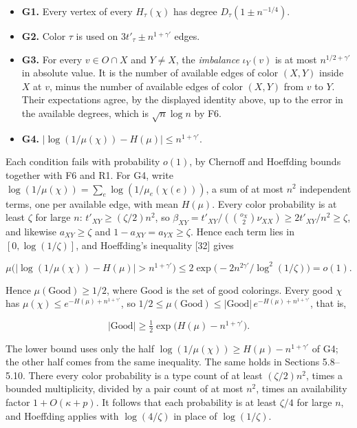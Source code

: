 \documentclass[english,11pt,a4paper]{article}
\providecommand{\tightlist}{\setlength{\itemsep}{0pt}\setlength{\parskip}{0pt}}
\begin{document}
\begin{itemize}
\tightlist
\item
  \textbf{G1.} Every vertex of every \(H_\tau(\chi)\) has degree \(D_\tau(1\pm n^{-1/4})\).
\item
  \textbf{G2.} Color \(\tau\) is used on \(3t'_\tau\pm n^{1+\gamma'}\) edges.
\item
  \textbf{G3.} For every \(v\in O\cap X\) and \(Y\ne X\), the \emph{imbalance} \(\iota_Y(v)\) is at most \(n^{1/2+\gamma'}\) in absolute value. It is the number of available edges of color \((X,Y)\) inside \(X\) at \(v\), minus the number of available edges of color \((X,Y)\) from \(v\) to \(Y\). Their expectations agree, by the displayed identity above, up to the error in the available degrees, which is \(\sqrt n\log n\) by F6.
\item
  \textbf{G4.} \(|\log(1/\mu(\chi))-H(\mu)|\le n^{1+\gamma'}\).
\end{itemize}

Each condition fails with probability \(o(1)\), by Chernoff and Hoeffding bounds together with F6 and R1. For G4, write \(\log(1/\mu(\chi))=\sum_e\log(1/\mu_e(\chi(e)))\), a sum of at most \(n^2\) independent terms, one per available edge, with mean \(H(\mu)\). Every color probability is at least \(\zeta\) for large \(n\): \(t'_{XY}\ge(\zeta/2)n^2\), so \(\beta_{XY}=t'_{XY}/(\binom{o_X}{2}\nu_{XX})\ge2t'_{XY}/n^2\ge\zeta\), and likewise \(a_{XY}\ge\zeta\) and \(1-a_{XY}=a_{YX}\ge\zeta\). Hence each term lies in \([0,\log(1/\zeta)]\), and Hoeffding's inequality {[}32{]} gives

\nopagebreak[4]
\[\mu\big(|\log(1/\mu(\chi))-H(\mu)|>n^{1+\gamma'}\big)\le2\exp\big(-2n^{2\gamma'}/\log^2(1/\zeta)\big)=o(1).\]

Hence \(\mu(\mathrm{Good})\ge1/2\), where \(\mathrm{Good}\) is the set of good colorings. Every good \(\chi\) has \(\mu(\chi)\le e^{-H(\mu)+n^{1+\gamma'}}\), so \(1/2\le\mu(\mathrm{Good})\le|\mathrm{Good}|\,e^{-H(\mu)+n^{1+\gamma'}}\), that is,

\nopagebreak[4]
\[|\mathrm{Good}|\ge\tfrac12\exp\big(H(\mu)-n^{1+\gamma'}\big).\]

The lower bound uses only the half \(\log(1/\mu(\chi))\ge H(\mu)-n^{1+\gamma'}\) of G4; the other half comes from the same inequality. The same holds in Sections 5.8--5.10. There every color probability is a type count of at least \((\zeta/2)n^2\), times a bounded multiplicity, divided by a pair count of at most \(n^2\), times an availability factor \(1+O(\kappa+p)\). It follows that each probability is at least \(\zeta/4\) for large \(n\), and Hoeffding applies with \(\log(4/\zeta)\) in place of \(\log(1/\zeta)\).
\end{document}
